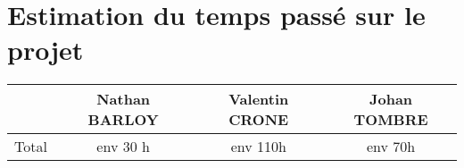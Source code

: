\section{Estimation du temps passé sur le projet}
\begin{center}
\begin{tabular}{|c||c|c|c|}
	\hline
	& Nathan BARLOY & Valentin CRONE & Johan TOMBRE \\
	\hline
	Total & env 30 h & env 110h &  env 70h \\
	\hline
\end{tabular}
\end{center}
